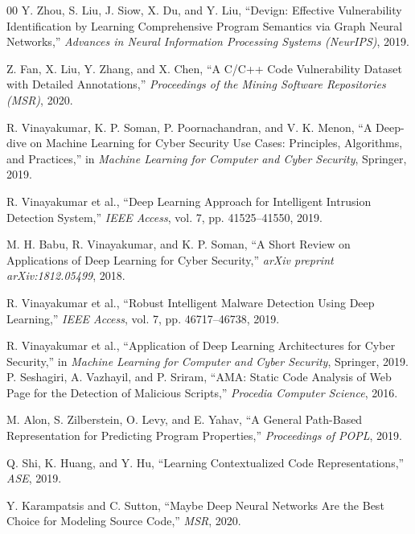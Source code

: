 \documentclass[conference]{IEEEtran}
\begin{document}
\begin{thebibliography}{00}
Y. Zhou, S. Liu, J. Siow, X. Du, and Y. Liu,
``Devign: Effective Vulnerability Identification by Learning Comprehensive Program Semantics via Graph Neural Networks,''
\emph{Advances in Neural Information Processing Systems (NeurIPS)}, 2019.

Z. Fan, X. Liu, Y. Zhang, and X. Chen,
``A C/C++ Code Vulnerability Dataset with Detailed Annotations,''
\emph{Proceedings of the Mining Software Repositories (MSR)}, 2020.


R. Vinayakumar, K. P. Soman, P. Poornachandran, and V. K. Menon,
``A Deep-dive on Machine Learning for Cyber Security Use Cases: Principles, Algorithms, and Practices,''
in \emph{Machine Learning for Computer and Cyber Security}, Springer, 2019.

R. Vinayakumar et al.,
``Deep Learning Approach for Intelligent Intrusion Detection System,''
\emph{IEEE Access}, vol. 7, pp. 41525--41550, 2019.

M. H. Babu, R. Vinayakumar, and K. P. Soman,
``A Short Review on Applications of Deep Learning for Cyber Security,''
\emph{arXiv preprint arXiv:1812.05499}, 2018.

R. Vinayakumar et al.,
``Robust Intelligent Malware Detection Using Deep Learning,''
\emph{IEEE Access}, vol. 7, pp. 46717--46738, 2019.

R. Vinayakumar et al.,
``Application of Deep Learning Architectures for Cyber Security,''
in \emph{Machine Learning for Computer and Cyber Security}, Springer, 2019.
P. Seshagiri, A. Vazhayil, and P. Sriram,
``AMA: Static Code Analysis of Web Page for the Detection of Malicious Scripts,''
\emph{Procedia Computer Science}, 2016.

M. Alon, S. Zilberstein, O. Levy, and E. Yahav,
``A General Path-Based Representation for Predicting Program Properties,''
\emph{Proceedings of POPL}, 2019.

Q. Shi, K. Huang, and Y. Hu,
``Learning Contextualized Code Representations,''
\emph{ASE}, 2019.

Y. Karampatsis and C. Sutton,
``Maybe Deep Neural Networks Are the Best Choice for Modeling Source Code,''
\emph{MSR}, 2020.

\end{thebibliography}
\end{document}
